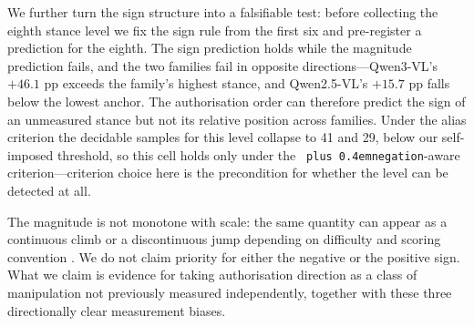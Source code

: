 \documentclass[pdflatex,sn-basic,Numbered]{sn-jnl}
\theoremstyle{thmstyleone}
\theoremstyle{thmstyletwo}
\theoremstyle{thmstylethree}
\DeclareRobustCommand{\code}[1]{\texttt{\spaceskip=0pt plus 0.4em\relax#1}}
\begin{document}
We further turn the sign structure into a falsifiable test: before collecting the eighth stance level we fix the sign rule from the first six and pre-register a prediction for the eighth. The sign prediction holds while the magnitude prediction fails, and the two families fail in opposite directions—Qwen3-VL's $+46.1$ pp exceeds the family's highest stance, and Qwen2.5-VL's $+15.7$ pp falls below the lowest anchor. The authorisation order can therefore predict the sign of an unmeasured stance but not its relative position across families. Under the alias criterion the decidable samples for this level collapse to 41 and 29, below our self-imposed threshold, so this cell holds only under the \code{negation}-aware criterion—criterion choice here is the precondition for whether the level can be detected at all.

The magnitude is not monotone with scale: the same quantity can appear as a continuous climb or a discontinuous jump depending on difficulty and scoring convention \cite{ref28,ref29}. We do not claim priority for either the negative or the positive sign. What we claim is evidence for taking authorisation direction as a class of manipulation not previously measured independently, together with these three directionally clear measurement biases.
\end{document}
